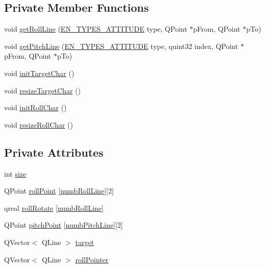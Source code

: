 \subsection*{Private Member Functions}
\begin{DoxyCompactItemize}
\item 
void \hyperlink{classqAttitudeIndicator_aaeaa7be50092cbfbf9b666ef5bc9aa4a}{get\-Roll\-Line} (\hyperlink{qattitudeindicator_8h_a343e47e8a321f67b38cb4522cb218c94}{E\-N\-\_\-\-T\-Y\-P\-E\-S\-\_\-\-A\-T\-T\-I\-T\-U\-D\-E} type, Q\-Point $\ast$p\-From, Q\-Point $\ast$p\-To)
\item 
void \hyperlink{classqAttitudeIndicator_a39c3505cf7817552213bf03c22b12bf7}{get\-Pitch\-Line} (\hyperlink{qattitudeindicator_8h_a343e47e8a321f67b38cb4522cb218c94}{E\-N\-\_\-\-T\-Y\-P\-E\-S\-\_\-\-A\-T\-T\-I\-T\-U\-D\-E} type, quint32 index, Q\-Point $\ast$p\-From, Q\-Point $\ast$p\-To)
\item 
void \hyperlink{classqAttitudeIndicator_a538e6a904f2a6521e21946541c23f596}{init\-Target\-Char} ()
\item 
void \hyperlink{classqAttitudeIndicator_a7589132ed175b095b8867881e99d26ab}{resize\-Target\-Char} ()
\item 
void \hyperlink{classqAttitudeIndicator_a4d477951cd83bf863eca1a395b092727}{init\-Roll\-Char} ()
\item 
void \hyperlink{classqAttitudeIndicator_a4367f3d4ba77c4dafcbbb99d23f00b58}{resize\-Roll\-Char} ()
\end{DoxyCompactItemize}
\subsection*{Private Attributes}
\begin{DoxyCompactItemize}
\item 
int \hyperlink{classqAttitudeIndicator_a0d7a73e4ee536cda1a005f626ef3935f}{size}
\item 
Q\-Point \hyperlink{classqAttitudeIndicator_a739d71cc4dfba5d2fbb23186372c4fd4}{roll\-Point} \mbox{[}\hyperlink{qattitudeindicator_8h_a533fb9cffe544953a1e34ef3ca40cd9aae68d533445c770721902ff44425e6cda}{numb\-Roll\-Line}\mbox{]}\mbox{[}2\mbox{]}
\item 
qreal \hyperlink{classqAttitudeIndicator_afa3060f26300228565f05c0200d553c2}{roll\-Rotate} \mbox{[}\hyperlink{qattitudeindicator_8h_a533fb9cffe544953a1e34ef3ca40cd9aae68d533445c770721902ff44425e6cda}{numb\-Roll\-Line}\mbox{]}
\item 
Q\-Point \hyperlink{classqAttitudeIndicator_a715b6a95898985f0f52ec6bf18010c9e}{pitch\-Point} \mbox{[}\hyperlink{qattitudeindicator_8h_a533fb9cffe544953a1e34ef3ca40cd9aaf86b1d616737ab90eedf9d904603bbc7}{numb\-Pitch\-Line}\mbox{]}\mbox{[}2\mbox{]}
\item 
Q\-Vector$<$ Q\-Line $>$ \hyperlink{classqAttitudeIndicator_a7f5a24dd1bf00a9e81d2aeb0ac83359e}{target}
\item 
Q\-Vector$<$ Q\-Line $>$ \hyperlink{classqAttitudeIndicator_ac5ace954b2f7b2d88aeae586a1246c30}{roll\-Pointer}
\end{DoxyCompactItemize}


